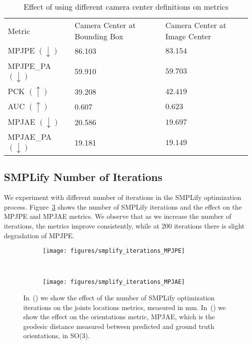\documentclass[runningheads]{llncs}
\begin{document}
\setlength{\tabcolsep}{4pt}
\begin{table}
	\begin{center}
		\caption{Effect of using different camera center definitions on metrics}
		\label{table:camera_center}
		\begin{tabular}{lll}
			\hline\noalign{\smallskip}
			Metric & Camera Center at Bounding Box & Camera Center at Image Center\\
			\noalign{\smallskip}
			\hline
			\noalign{\smallskip}
			MPJPE $ (\downarrow) $ & 86.103 & $ \bm{83.154} $\\
			{MPJPE\_PA} $ (\downarrow) $& 59.910 & $ \bm{59.703} $\\
			PCK $ (\uparrow) $& 39.208 & $ \bm{42.419} $\\
			AUC $ (\uparrow) $& 0.607 & $ \bm{0.623} $\\
			MPJAE $ (\downarrow) $& 20.586 & $ \bm{19.697} $\\
			{MPJAE\_PA} $ (\downarrow) $& 19.181 & $ \bm{19.149} $\\
			\hline
		\end{tabular}
	\end{center}
\end{table}
\setlength{\tabcolsep}{1.4pt}


\subsection{SMPLify Number of Iterations}

We experiment with different number of iterations in the SMPLify optimization process. Figure~\ref{fig:smplify_iters} shows the number of SMPLify iterations and the effect on the MPJPE and MPJAE metrics. We observe that as we increase the number of iterations, the metrics improve consistently, while at 200 iterations there is slight degradation of MPJPE.

\begin{figure}[h!]
	
	\begin{subfigure}[t]{0.5\textwidth}
		\texttt{[image: figures/smplify\_iterations\_MPJPE]}
		\centering
\caption{}
		\label{fig:smplify_iters_MPJPE}
	\end{subfigure}
	~
	\begin{subfigure}[t]{0.5\textwidth}
		\texttt{[image: figures/smplify\_iterations\_MPJAE]}
		\centering
\caption{}
		\label{fig:smplify_iters_MPJAE}
	\end{subfigure}
	\caption{In~() we show the effect of the number of SMPLify optimization iterations on the joints locations metrics, measured in mm. In~() we show the effect on the orientations metric, MPJAE, which is the geodesic distance measured between predicted and ground truth orientations, in SO(3).}
	\label{fig:smplify_iters}
\end{figure}
\end{document}
